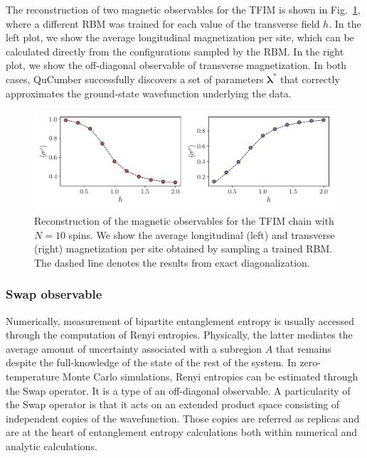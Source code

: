\documentclass[submission, Phys, hidelnks]{SciPost}
\begin{document}
The reconstruction of two magnetic observables for the TFIM is shown in Fig.~\ref{tfim_magn}, where a different RBM was trained for each value of the transverse field $h$. In the left plot, we show the average longitudinal magnetization per site, which can be calculated directly from the configurations sampled by the RBM. In the right plot, we show the off-diagonal observable of transverse magnetization. In both cases, QuCumber successfully discovers a set of parameters $\bm{\lambda}^*$ that correctly approximates the ground-state wavefunction underlying the data.

\begin{figure}[htb]
    \centering{}
    \includegraphics[width=\columnwidth, trim={0 15 0 0}, clip]{obs.pdf}
    \caption{\label{tfim_magn} Reconstruction of the magnetic observables for the TFIM chain with $N=10$ spins. We show the average longitudinal (left) and transverse (right) magnetization per site obtained by sampling a trained RBM. The dashed line denotes the results from exact diagonalization.}
\end{figure}

\subsubsection{Swap observable }
\label{sec:swap}

Numerically, measurement of bipartite entanglement entropy is usually accessed through the computation of Renyi entropies. Physically, the latter mediates the average amount of uncertainty associated with a subregion $A$ that remains despite the full-knowledge of the state of the rest of the system. In zero-temperature Monte Carlo simulations, Renyi entropies can be estimated through the Swap operator. It is a type of an off-diagonal observable. A particularity of the Swap operator is that it acts on an extended product space consisting of independent copies of the wavefunction. Those copies are referred as replicas and are at the heart of entanglement entropy calculations both within numerical and analytic calculations. 
\end{document}
